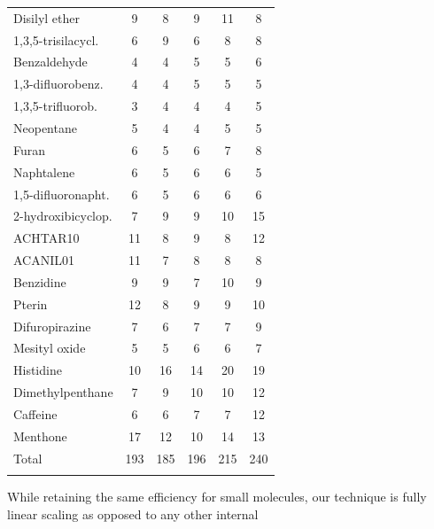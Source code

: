 \documentclass[prl,aps,twocolumn,showpacs,twocolumngrid,superbib]{revtex4}
\begin{document}
\begin{table}[h]
\begin{tabular}{lccccc}
Disilyl ether          &   9    &   8    &    9    &   11   &   8     \\
1,3,5-trisilacycl.     &   6    &   9    &    6    &    8   &   8     \\
Benzaldehyde           &   4    &   4    &    5    &    5   &   6     \\
1,3-difluorobenz.      &   4    &   4    &    5    &    5   &   5     \\
1,3,5-trifluorob.      &   3    &   4    &    4    &    4   &   5     \\
Neopentane             &   5    &   4    &    4    &    5   &   5     \\
Furan                  &   6    &   5    &    6    &    7   &   8     \\
Naphtalene             &   6    &   5    &    6    &    6   &   5     \\
1,5-difluoronapht.     &   6    &   5    &    6    &    6   &   6     \\
2-hydroxibicyclop.     &   7    &   9    &    9    &   10   &  15     \\
ACHTAR10               &  11    &   8    &    9    &    8   &  12     \\
ACANIL01               &  11    &   7    &    8    &    8   &   8     \\
Benzidine              &   9    &   9    &    7    &   10   &   9     \\
Pterin                 &  12    &   8    &    9    &    9   &  10     \\
Difuropirazine         &   7    &   6    &    7    &    7   &   9     \\
Mesityl oxide          &   5    &   5    &    6    &    6   &   7     \\
Histidine              &  10    &  16    &   14    &   20   &  19     \\
Dimethylpenthane       &   7    &   9    &   10    &   10   &  12     \\
Caffeine               &   6    &   6    &    7    &    7   &  12     \\
Menthone               &  17    &  12    &   10    &   14   &  13     \\
\colrule
Total                  & 193    & 185    &  196    &  215   & 240     \\
\botrule
\end{tabular}
\end{table}
While retaining the same efficiency for small molecules, our technique
is fully linear scaling as opposed to any other internal 
\end{document}

